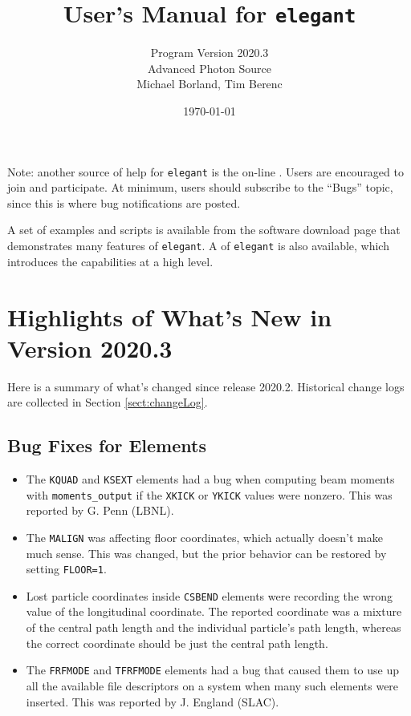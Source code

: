 \documentclass[11pt]{article}
\begin{document}
\title{User's Manual for {\tt elegant}}
\author{Program Version 2020.3\\Advanced Photon Source\\Michael Borland, Tim Berenc\\ \date{\today}}
\maketitle

Note: another source of help for {\tt elegant} is the on-line
.
Users are encouraged to join and participate.  At minimum, users should subscribe to the ``Bugs'' topic,
since this is where bug notifications are posted.

A set of examples and scripts is 
available from the software download page that demonstrates many features of {\tt elegant}.  A  of {\tt elegant} is also available, which introduces the capabilities
at a high level.

\section{Highlights of What's New in Version 2020.3}

Here is a summary of what's changed since release 2020.2.  Historical change logs are collected in Section
\ref{sect:changeLog}.

\subsection{Bug Fixes for Elements}

\begin{itemize}
\item The \verb|KQUAD| and \verb|KSEXT| elements had a bug when computing beam moments with \verb|moments_output|
  if the \verb|XKICK| or \verb|YKICK| values were nonzero. This was reported by G. Penn (LBNL).
\item The \verb|MALIGN| was affecting floor coordinates, which actually doesn't make much sense. This was changed, but
  the prior behavior can be restored by setting \verb|FLOOR=1|.
\item Lost particle coordinates inside \verb|CSBEND| elements were recording the wrong value of the longitudinal coordinate.
  The reported coordinate was a mixture of the central path length and the individual particle's path length, whereas the
  correct coordinate should be just the central path length.
\item The \verb|FRFMODE| and \verb|TFRFMODE| elements had a bug that caused them to use up all the available
  file descriptors on a system when many such elements were inserted. This was reported by J. England (SLAC).
\end{itemize}
\end{document}
